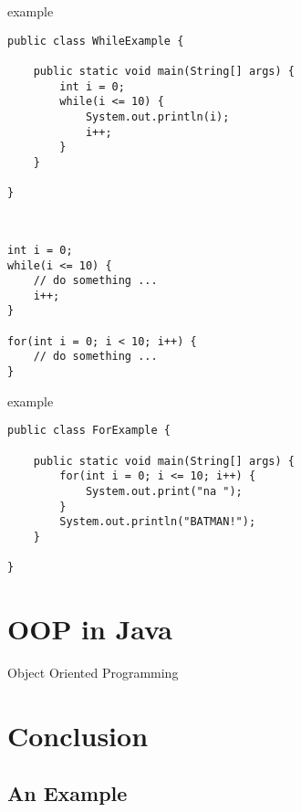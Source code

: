 \begin{frame}[fragile]{ example}
\begin{lstlisting}
public class WhileExample {

    public static void main(String[] args) {
        int i = 0;
        while(i <= 10) {
            System.out.println(i);
            i++;
        }
    }
    
}\end{lstlisting}
\end{frame}

\subsection{}
\begin{frame}[fragile]{}
\begin{lstlisting}

int i = 0;
while(i <= 10) {
    // do something ... 
    i++;
}

for(int i = 0; i < 10; i++) {
    // do something ... 
}\end{lstlisting}
\end{frame}

\begin{frame}[fragile]{ example}
\begin{lstlisting}
public class ForExample {

    public static void main(String[] args) {
        for(int i = 0; i <= 10; i++) {
            System.out.print("na ");
        }
        System.out.println("BATMAN!");
    }
    
}\end{lstlisting}
\end{frame}


\section{OOP in Java}

\begin{frame}{}
    \begin{center}
        {\huge Object Oriented Programming}
    \end{center}
\end{frame}

\section{Conclusion}
\subsection{An Example}

